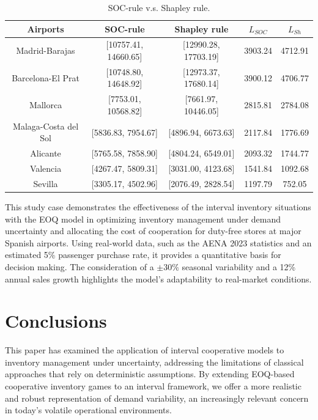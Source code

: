 \documentclass[12pt]{article}
\begin{document}
 \begin{table}[h]
    \centering
    \begin{tabular}{c|c|c|c|c|}
        \textbf{Airports} &\textbf{SOC-rule} &\textbf{Shapley rule}   & \textbf{$L_{SOC}$} & \textbf{$L_{Sh}$}\\ \hline
         Madrid-Barajas &   [10757.41, 14660.65] & [12990.28, 17703.19] & 3903.24 & 4712.91 \\
        Barcelona-El Prat  & [10748.80, 14648.92] & [12973.37, 17680.14] & 3900.12 & 4706.77 \\
         Mallorca  & [7753.01, 10568.82]  & [7661.97, 10446.05]   &  2815.81 &  2784.08 \\
         Malaga-Costa del Sol  & [5836.83, 7954.67]  & [4896.94, 6673.63]  & 2117.84 & 1776.69 \\
             Alicante  & [5765.58, 7858.90]  & [4804.24, 6549.01]  & 2093.32&  1744.77 \\
         Valencia  & [4267.47, 5809.31]  & [3031.00, 4123.68] & 1541.84 & 1092.68 \\
         Sevilla   & [3305.17, 4502.96]  & [2076.49, 2828.54] & 1197.79 & 752.05 \\
    \end{tabular}
    \caption{SOC-rule v.s. Shapley rule.}
    \label{tabla.3.}
\end{table}


This study case demonstrates the effectiveness of the interval inventory situations with the EOQ model in optimizing inventory management under demand uncertainty and allocating the cost of cooperation for duty-free stores at major Spanish airports.  Using real-world data, such as the AENA 2023 statistics and an estimated 5\% passenger
purchase rate, it provides a quantitative basis for decision making.
The consideration of a $\pm 30\%$ seasonal variability and a 12\% annual
sales growth highlights the model's adaptability to real-market conditions.

\section{Conclusions}\label{sec:6} 

\noindent This paper has examined the application of interval cooperative models to inventory management under uncertainty, addressing the limitations of classical approaches that rely on deterministic assumptions. By extending EOQ-based cooperative inventory games to an interval framework, we offer a more realistic and robust representation of demand variability, an increasingly relevant concern in today’s volatile operational environments.
\end{document}
